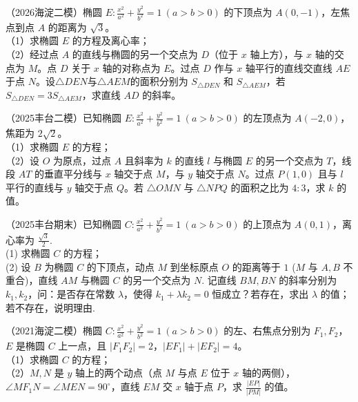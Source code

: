 \begin{example} %
（2026海淀二模）椭圆 $E:\frac{x^2}{a^2}+\frac{y^2}{b^2}=1\ (a>b>0)$ 的下顶点为 $A(0,-1)$，左焦点到点 $A$ 的距离为 $\sqrt{3}$。\\
（1）求椭圆 $E$ 的方程及离心率；\\
（2）经过点 $A$ 的直线与椭圆的另一个交点为 $D$（位于 $x$ 轴上方），与 $x$ 轴的交点为 $M$。点 $D$ 关于 $x$ 轴的对称点为 $E$。过点 $D$ 作与 $x$ 轴平行的直线交直线 $AE$ 于点 $N$。设$\triangle DEN$与$\triangle AEM$的面积分别为 $S_{\triangle DEN}$ 和 $S_{\triangle AEM}$，若 $S_{\triangle DEN}=3S_{\triangle AEM}$，求直线 $AD$ 的斜率。
\end{example}

\begin{example} %
（2025丰台二模）已知椭圆 $E:\frac{x^2}{a^2}+\frac{y^2}{b^2}=1\ (a>b>0)$ 的左顶点为 $A(-2,0)$，焦距为 $2\sqrt{2}$。\\
（1）求椭圆 $E$ 的方程；\\
（2）设 $O$ 为原点，过点 $A$ 且斜率为 $k$ 的直线 $l$ 与椭圆 $E$ 的另一个交点为 $T$，线段 $AT$ 的垂直平分线与 $x$ 轴交于点 $M$，与 $y$ 轴交于点 $N$。过点 $P(1,0)$ 且与 $l$ 平行的直线与 $y$ 轴交于点 $Q$。若 $\triangle OMN$ 与 $\triangle NPQ$ 的面积之比为 $4:3$，求 $k$ 的值。
\end{example}


\begin{example} %
（2025丰台期末）已知椭圆 $C:\frac{x^{2}}{a^{2}}+\frac{y^{2}}{b^{2}}=1\ (a>b>0)$ 的上顶点为 $A(0,1)$，离心率为 $\frac{\sqrt{3}}{2}$.\\
(1) 求椭圆 $C$ 的方程；\\
(2) 设 $B$ 为椭圆 $C$ 的下顶点，动点 $M$ 到坐标原点 $O$ 的距离等于 $1$ ($M$ 与 $A,B$ 不重合)，直线 $AM$ 与椭圆 $C$ 的另一个交点为 $N$. 记直线 $BM, BN$ 的斜率分别为 $k_{1}, k_{2}$，问：是否存在常数 $\lambda$，使得 $k_{1}+\lambda k_{2}=0$ 恒成立？若存在，求出 $\lambda$ 的值；若不存在，说明理由.
\end{example}



\begin{example} %
（2021海淀二模）椭圆 $C:\frac{x^2}{a^2}+\frac{y^2}{b^2}=1\ (a>b>0)$ 的左、右焦点分别为 $F_1,F_2$，$E$ 是椭圆 $C$ 上一点，且 $\lvert F_1F_2\rvert=2$，$\lvert EF_1\rvert+\lvert EF_2\rvert=4$。\\
（1）求椭圆 $C$ 的方程；\\
（2）$M,N$ 是 $y$ 轴上的两个动点（点 $M$ 与点 $E$ 位于 $x$ 轴的两侧），$\angle MF_1N=\angle MEN=90^\circ$，直线 $EM$ 交 $x$ 轴于点 $P$，求 $\frac{\lvert EP\rvert}{\lvert PM\rvert}$ 的值。
\end{example}


